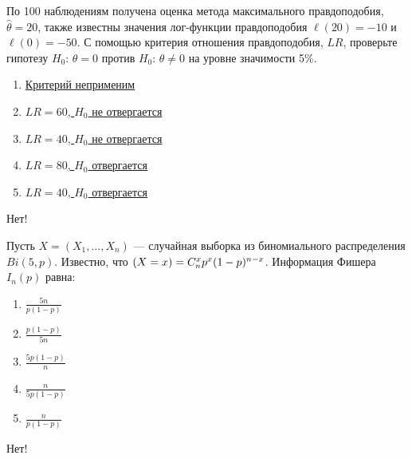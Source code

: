 \documentclass[t]{beamer}
\let\P\relax
\DeclareMathOperator{\P}{\mathbb{P}}
\begin{document}
 \begin{frame} \label{39-No} 
\begin{block}{39} 

  По 100 наблюдениям получена оценка метода максимального правдоподобия, $\hat\theta = 20$, также известны значения лог-функции правдоподобия $\ell(20) = -10$ и $\ell(0)= - 50$. С помощью критерия отношения правдоподобия, $LR$, проверьте гипотезу $H_0$: $\theta = 0$ против $H_0$: $\theta \neq 0$ на уровне значимости 5\%.
  


 \end{block} 
\begin{enumerate} 
\item[] \hyperlink{39-No}{\beamergotobutton{} Критерий неприменим}
\item[] \hyperlink{39-No}{\beamergotobutton{} $LR = 60$, $H_0$ не отвергается}
\item[] \hyperlink{39-No}{\beamergotobutton{} $LR = 40$, $H_0$ не отвергается}
\item[] \hyperlink{39-Yes}{\beamergotobutton{} $LR = 80$, $H_0$ отвергается }
\item[] \hyperlink{39-No}{\beamergotobutton{} $LR = 40$, $H_0$  отвергается}
\end{enumerate} 

 \alert{Нет!} 
\end{frame} 


 \begin{frame} \label{40-No} 
\begin{block}{40} 

Пусть $X = (X_1, \ldots , X_n)$ — случайная выборка из биномиального распределения $Bi(5, p)$. Известно, что $\P(X = x) =C_n^x p^x(1-p)^{n-x} $. Информация Фишера $I_n(p)$ равна:
  


 \end{block} 
\begin{enumerate} 
\item[] \hyperlink{40-Yes}{\beamergotobutton{} $\frac{5n}{p(1-p)}$}
\item[] \hyperlink{40-No}{\beamergotobutton{} $\frac{p(1-p)}{5n}$}
\item[] \hyperlink{40-No}{\beamergotobutton{} $\frac{5p(1-p)}{n}$}
\item[] \hyperlink{40-No}{\beamergotobutton{}$\frac{n}{5p(1-p)}$}
\item[] \hyperlink{40-No}{\beamergotobutton{} $\frac{n}{p(1-p)}$}
\end{enumerate} 

 \alert{Нет!} 
\end{frame} 
\end{document}
